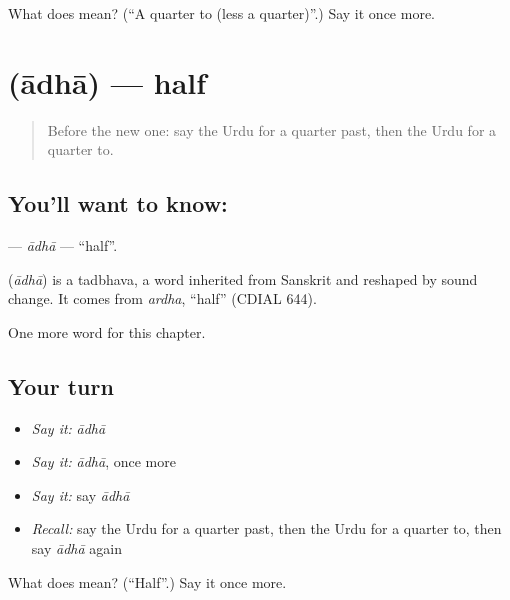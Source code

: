 \begin{tcolorbox}[breakable,colback=teal!4,colframe=teal!35!black,title={Before you move on}]
What does  mean? (\textquotedblleft{}A quarter to (less a quarter)\textquotedblright{}.) Say it once more.
\end{tcolorbox}
\section[\texorpdfstring{\ur{آدھا} (ādhā)}{آدھا (ādhā)}]{ (ādhā) — half}

\label{lesson:UR-C93-adha}



\begin{quote}
Before the new one: say the Urdu for a quarter past, then the Urdu for a quarter to.
\end{quote}

\subsection*{You'll want to know: }
\textbf{} — \emph{ādhā} — \textquotedblleft{}half\textquotedblright{}.

\begin{cousinweb}
\textbf{} (\emph{ādhā}) is a tadbhava, a word inherited from Sanskrit and reshaped by sound change. It comes from \emph{ardha}, \textquotedblleft{}half\textquotedblright{} (CDIAL 644).
\end{cousinweb}

\begin{grammarlens}[title={What you've built}]
One more word for this chapter.
\end{grammarlens}

\subsection*{Your turn}
\begin{itemize}
\raggedright
  \item \emph{Say it:} \emph{ādhā}
  \item \emph{Say it:} \emph{ādhā}, once more
  \item \emph{Say it:} say \emph{ādhā}
  \item \emph{Recall:} say the Urdu for a quarter past, then the Urdu for a quarter to, then say \emph{ādhā} again
\end{itemize}

\begin{tcolorbox}[breakable,colback=teal!4,colframe=teal!35!black,title={Before you move on}]
What does  mean? (\textquotedblleft{}Half\textquotedblright{}.) Say it once more.
\end{tcolorbox}
